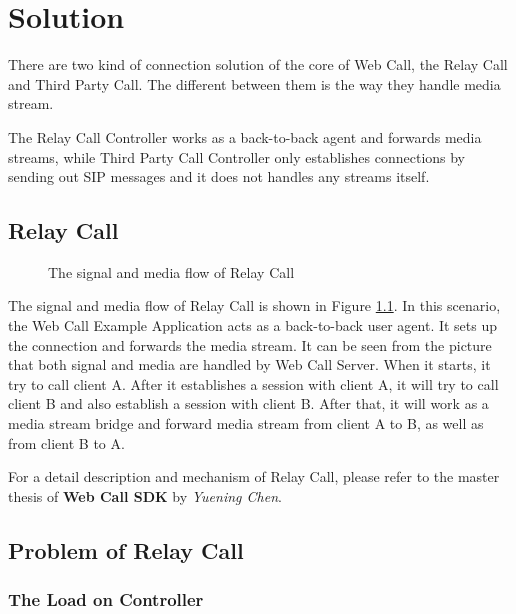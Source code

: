 \chapter{Solution}
\label{sec:Solution}

There are two kind of connection solution of the core of Web Call, the Relay Call and Third Party Call. The different between them is the way they handle media stream.

The Relay Call Controller works as a back-to-back agent and forwards media streams, while Third Party Call Controller only establishes connections by sending out SIP messages and it does not handles any streams itself. 

\section{Relay Call}
\label{sec:Solution:RelayCall}

\begin{figure}[!hbtp]
\centering
{}
\caption{The signal and media flow of Relay Call}
\label{fig:TheSignalAndMediaFlowOfRelayCall}
\end{figure}

The signal and media flow of Relay Call is shown in Figure \ref{fig:TheSignalAndMediaFlowOfRelayCall}. In this scenario, the Web Call Example Application acts as a back-to-back user agent. It sets up the connection and forwards the media stream. It can be seen from the picture that both signal and media are handled by Web Call Server. When it starts, it try to call client A. After it establishes a session with client A, it will try to call client B and also establish a session with client B. After that, it will work as a media stream bridge and forward media stream from client A to B, as well as from client B to A.

For a detail description and mechanism of Relay Call, please refer to the master thesis of \textbf{Web Call SDK} by \textit{Yuening Chen}\cite{WebCallSDK}.

\section{Problem of Relay Call}
\label{sec:Solution:ProblemOfRelayCall}

\subsection{The Load on Controller}
\label{sec:Solution:ProblemOfRelayCall:TheLoadOnController}
 
